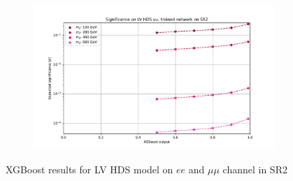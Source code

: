 \documentclass[12pt, a4paper]{book}
\begin{document}
\begin{figure}[!ht]
\begin{subfigure}[b]{0.49\textwidth}
   \end{subfigure}
   \hfill
   \begin{subfigure}[b]{0.49\textwidth}
      \centering
      \includegraphics[width=1\textwidth]{XGBoost/Model_independent/100-150/LV_HDS/EXP_SIG_uu.pdf}
   \end{subfigure}
   \caption{XGBoost results for LV HDS model on $ee$ and $\mu\mu$ channel in SR2}\label{fig:LV_HDS_SR2}
\end{figure}
\end{document}
